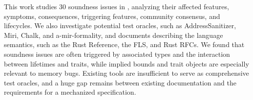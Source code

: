 This work studies 30 soundness issues in \rustc{}, analyzing their affected
features, symptoms, consequences, triggering features, community consensus, and
lifecycles.
%
We also investigate potential test oracles, such as AddressSanitizer, Miri,
Chalk, and a-mir-formality, and documents describing the language semantics,
such as the Rust Reference, the FLS, and Rust RFCs.
%
We found that soundness issues are often triggered by associated types and the
interaction between lifetimes and traits, while implied bounds and trait objects
are especially relevant to memory bugs.
%
Existing tools are insufficient to serve as comprehensive test oracles, and a
huge gap remains between existing documentation and the requirements for a
mechanized specification.
